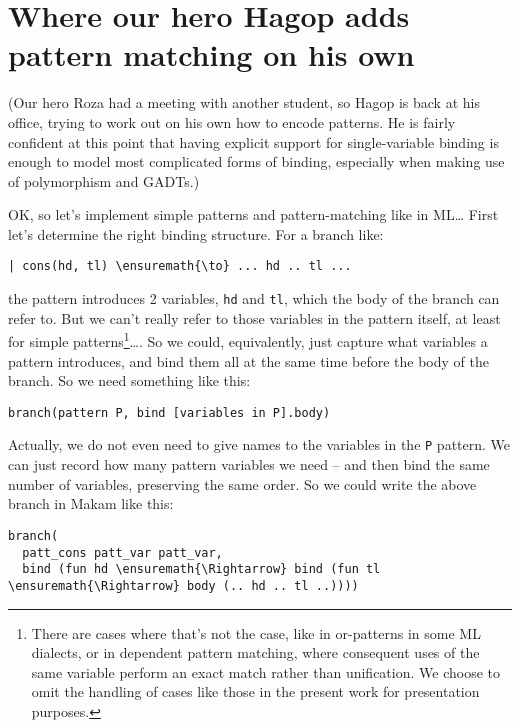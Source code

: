 \section{Where our hero Hagop adds pattern matching on his
own}\label{where-our-hero-hagop-adds-pattern-matching-on-his-own}

\begin{scenecomment}
(Our hero Roza had a meeting with another student, so Hagop is back at his
office, trying to work out on his own how to encode patterns. He is fairly
confident at this point that having explicit support for single-variable
binding is enough to model most complicated forms of binding, especially when making use of
polymorphism and GADTs.)
\end{scenecomment}

\identNormal
\heroSTUDENT{} OK, so let's implement simple patterns and pattern-matching
like in ML\ldots{} First let's determine the right binding structure.
For a branch like:

\begin{verbatim}
| cons(hd, tl) \ensuremath{\to} ... hd .. tl ...
\end{verbatim}

the pattern introduces 2 variables, \texttt{hd} and \texttt{tl}, which
the body of the branch can refer to. But we can't really refer to those
variables in the pattern itself, at least for simple
patterns\footnote{There are cases where that's not the case, like in or-patterns in some ML dialects, or in dependent pattern matching, where consequent uses of the same variable perform an exact match rather than unification. We choose to omit the handling of cases like those in the present work for presentation purposes.}\ldots{}.
So we could, equivalently, just capture what variables a pattern
introduces, and bind them all at the same time before the body of the
branch. So we need something like this:

\begin{verbatim}
branch(pattern P, bind [variables in P].body)
\end{verbatim}

Actually, we do not even need to give names to the variables in the
\texttt{P} pattern. We can just record how many pattern variables we
need -- and then bind the same number of variables, preserving the same
order. So we could write the above branch in Makam like this:

\begin{verbatim}
branch(
  patt_cons patt_var patt_var,
  bind (fun hd \ensuremath{\Rightarrow} bind (fun tl \ensuremath{\Rightarrow} body (.. hd .. tl ..))))
\end{verbatim}

